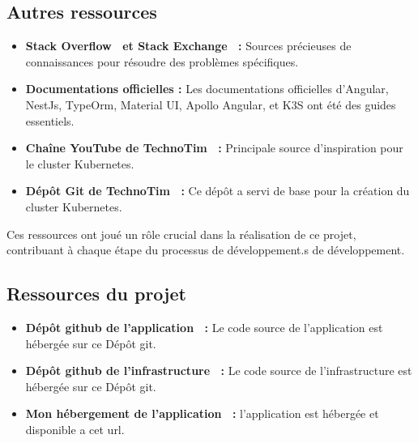 \subsection{Autres ressources}\label{subsec:autres-ressources}
\begin{itemize}
    \item \textbf{Stack Overflow~\cite{StackOve24:online} et Stack Exchange~\cite{HotQuest86:online} :} Sources précieuses de connaissances pour résoudre des problèmes spécifiques.
    \item \textbf{Documentations officielles :} Les documentations officielles d'Angular, NestJs, TypeOrm, Material UI, Apollo Angular, et K3S ont été des guides essentiels.
    \item \textbf{Chaîne YouTube de TechnoTim~\cite{1TechnoT44:online} :} Principale source d'inspiration pour le cluster Kubernetes.
    \item \textbf{Dépôt Git de TechnoTim~\cite{technoti52:online} :} Ce dépôt a servi de base pour la création du cluster Kubernetes.
\end{itemize}

Ces ressources ont joué un rôle crucial dans la réalisation de ce projet, contribuant à chaque étape du processus de développement.s de développement.

\subsection{Ressources du projet}\label{subsec:ressources-du-projet}
\begin{itemize}
    \item \textbf{Dépôt github de l'application~\cite{craftbra13:online} :} Le code source de l'application est hébergée sur ce Dépôt git.
    \item \textbf{Dépôt github de l'infrastructure~\cite{craftbra86:online} :} Le code source de l'infrastructure est hébergée sur ce Dépôt git.
    \item \textbf{Mon hébergement de l'application~\cite{CleverPa16:online} :} l'application est hébergée et disponible a cet url.
\end{itemize}